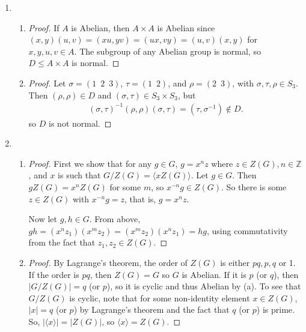 \documentclass[11pt, letterpaper]{article}
\begin{document}
\begin{enumerate}
  \item \begin{enumerate}
    \item \begin{proof}
      If $A$ is Abelian, then $A \times A$ is Abelian since $(x, y)(u, v) = (xu, yv) = (ux, vy) = (u, v)(x, y)$ for $x, y, u, v \in A$. The subgroup of any Abelian group is normal, so $D \leq A \times A$ is normal.
    \end{proof}
    \item \begin{proof}
      Let $\sigma = (1 \enspace 2 \enspace 3)$, $\tau = (1 \enspace 2)$, and $\rho = (2 \enspace 3)$, with $\sigma, \tau, \rho \in S_3$. Then $(\rho, \rho) \in D$ and $(\sigma, \tau) \in S_3 \times S_3$, but
      \begin{align*}
        (\sigma, \tau)^{-1}(\rho, \rho)(\sigma, \tau)
        = (\tau, \sigma^{-1}) \not\in D.
      \end{align*}
      so $D$ is not normal.
    \end{proof}
  \end{enumerate}

  \item \begin{enumerate}
    \item \begin{proof}
      First we show that for any $g \in G$, $g = x^nz$ where $z \in Z(G), n \in \mathbb Z$, and $x$ is such that $G/Z(G) = \langle xZ(G) \rangle$. Let $g \in G$. Then $gZ(G) = x^n Z(G)$ for some $m$, so $x^{-n}g \in Z(G)$. So there is some $z \in Z(G)$ with $x^{-n}g = z$, that is, $g = x^nz$.

      Now let $g, h \in G$. From above,
      $gh = (x^n z_1) (x^m z_2)
        = (x^m z_2) (x^nz_1)
        = hg$,
      using commutativity from the fact that $z_1, z_2 \in Z(G)$.
    \end{proof}
    \item \begin{proof}
      By Lagrange's theorem, the order of $Z(G)$ is either $pq, p, q$ or 1. If the order is $pq$, then $Z(G) = G$ so $G$ is Abelian. If it is $p$ (or $q$), then $\vert G/Z(G) \vert = q$ (or $p$), so it is cyclic and thus Abelian by (a). To see that $G/Z(G)$ is cyclic, note that for some non-identity element $x \in Z(G)$, $\vert x \vert = q$ (or $p$) by Lagrange's theorem and the fact that $q$ (or $p$) is prime. So, $\vert \langle x \rangle \vert = \vert Z(G) \vert$, so $\langle x \rangle = Z(G)$.


\end{proof}
\end{enumerate}
\end{enumerate}
\end{document}
